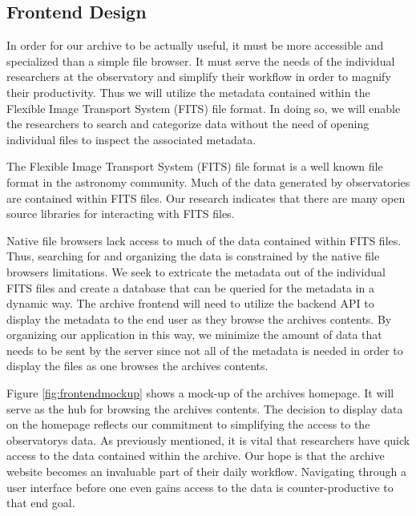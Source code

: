 \documentclass[12pt]{article}
\begin{document}
\subsection{Frontend Design}

In order for our archive to be actually useful, it must be more accessible and specialized than a simple file browser. It must serve the needs of the individual researchers at the observatory and simplify their workflow in order to magnify their productivity. Thus we will utilize the metadata contained within the Flexible Image Transport System (FITS) file format. In doing so, we will enable the researchers to search and categorize data without the need of opening individual files to inspect the associated metadata.

The Flexible Image Transport System (FITS) file format is a well known file format in the astronomy community. Much of the data generated by observatories are contained within FITS files. Our research indicates that there are many open source libraries for interacting with FITS files.

Native file browsers lack access to much of the data contained within FITS files. Thus, searching for and organizing the data is constrained by the native file browsers limitations. We seek to extricate the metadata out of the individual FITS files and create a database that can be queried for the metadata in a dynamic way. The archive frontend will need to utilize the backend API to display the metadata to the end user as they browse the archives contents. By organizing our application in this way, we minimize the amount of data that needs to be sent by the server since not all of the metadata is needed in order to display the files as one browses the archives contents.

Figure \ref{fig:frontendmockup} shows a mock-up of the archives homepage. It will serve as the hub for browsing the archives contents. The decision to display data on the homepage reflects our commitment to simplifying the access to the observatorys data. As previously mentioned, it is vital that researchers have quick access to the data contained within the archive. Our hope is that the archive website becomes an invaluable part of their daily workflow. Navigating through a user interface before one even gains access to the data is counter-productive to that end goal.
\end{document}
